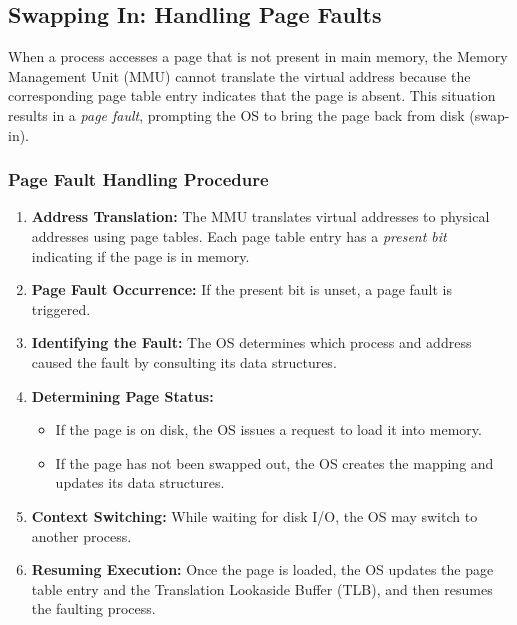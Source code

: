 \subsection{Swapping In: Handling Page Faults}
When a process accesses a page that is not present in main memory, the Memory Management Unit (MMU) cannot translate the virtual address because the corresponding page table entry indicates that the page is absent. This situation results in a \emph{page fault}, prompting the OS to bring the page back from disk (swap-in).

\subsubsection{Page Fault Handling Procedure}
\begin{enumerate}
    \item \textbf{Address Translation:} The MMU translates virtual addresses to physical addresses using page tables. Each page table entry has a \textit{present bit} indicating if the page is in memory.
    \item \textbf{Page Fault Occurrence:} If the present bit is unset, a page fault is triggered.
    \item \textbf{Identifying the Fault:} The OS determines which process and address caused the fault by consulting its data structures.
    \item \textbf{Determining Page Status:}
    \begin{itemize}
        \item If the page is on disk, the OS issues a request to load it into memory.
        \item If the page has not been swapped out, the OS creates the mapping and updates its data structures.
    \end{itemize}
    \item \textbf{Context Switching:} While waiting for disk I/O, the OS may switch to another process.
    \item \textbf{Resuming Execution:} Once the page is loaded, the OS updates the page table entry and the Translation Lookaside Buffer (TLB), and then resumes the faulting process.
\end{enumerate}

